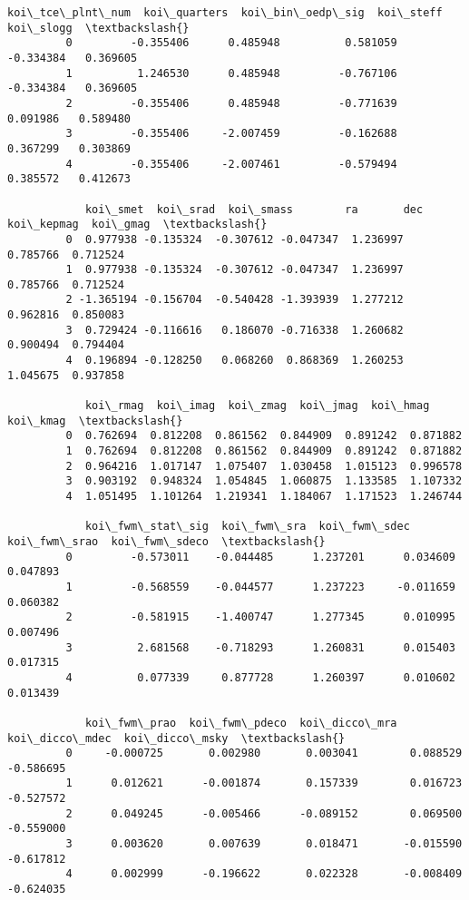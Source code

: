 \documentclass[11pt]{article}
\begin{document}
\begin{Verbatim}[commandchars=\\\{\}]
            koi\_tce\_plnt\_num  koi\_quarters  koi\_bin\_oedp\_sig  koi\_steff  koi\_slogg  \textbackslash{}
         0         -0.355406      0.485948          0.581059  -0.334384   0.369605   
         1          1.246530      0.485948         -0.767106  -0.334384   0.369605   
         2         -0.355406      0.485948         -0.771639   0.091986   0.589480   
         3         -0.355406     -2.007459         -0.162688   0.367299   0.303869   
         4         -0.355406     -2.007461         -0.579494   0.385572   0.412673   
         
            koi\_smet  koi\_srad  koi\_smass        ra       dec  koi\_kepmag  koi\_gmag  \textbackslash{}
         0  0.977938 -0.135324  -0.307612 -0.047347  1.236997    0.785766  0.712524   
         1  0.977938 -0.135324  -0.307612 -0.047347  1.236997    0.785766  0.712524   
         2 -1.365194 -0.156704  -0.540428 -1.393939  1.277212    0.962816  0.850083   
         3  0.729424 -0.116616   0.186070 -0.716338  1.260682    0.900494  0.794404   
         4  0.196894 -0.128250   0.068260  0.868369  1.260253    1.045675  0.937858   
         
            koi\_rmag  koi\_imag  koi\_zmag  koi\_jmag  koi\_hmag  koi\_kmag  \textbackslash{}
         0  0.762694  0.812208  0.861562  0.844909  0.891242  0.871882   
         1  0.762694  0.812208  0.861562  0.844909  0.891242  0.871882   
         2  0.964216  1.017147  1.075407  1.030458  1.015123  0.996578   
         3  0.903192  0.948324  1.054845  1.060875  1.133585  1.107332   
         4  1.051495  1.101264  1.219341  1.184067  1.171523  1.246744   
         
            koi\_fwm\_stat\_sig  koi\_fwm\_sra  koi\_fwm\_sdec  koi\_fwm\_srao  koi\_fwm\_sdeco  \textbackslash{}
         0         -0.573011    -0.044485      1.237201      0.034609       0.047893   
         1         -0.568559    -0.044577      1.237223     -0.011659       0.060382   
         2         -0.581915    -1.400747      1.277345      0.010995       0.007496   
         3          2.681568    -0.718293      1.260831      0.015403       0.017315   
         4          0.077339     0.877728      1.260397      0.010602       0.013439   
         
            koi\_fwm\_prao  koi\_fwm\_pdeco  koi\_dicco\_mra  koi\_dicco\_mdec  koi\_dicco\_msky  \textbackslash{}
         0     -0.000725       0.002980       0.003041        0.088529       -0.586695   
         1      0.012621      -0.001874       0.157339        0.016723       -0.527572   
         2      0.049245      -0.005466      -0.089152        0.069500       -0.559000   
         3      0.003620       0.007639       0.018471       -0.015590       -0.617812   
         4      0.002999      -0.196622       0.022328       -0.008409       -0.624035   
         

\end{Verbatim}
\end{document}
